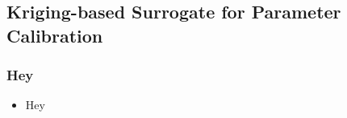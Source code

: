 \subsection{Kriging-based Surrogate for Parameter Calibration}

\begin{frame}
\frametitle{Hey}

\begin{itemize}
  \item Hey
\end{itemize}

\end{frame}





